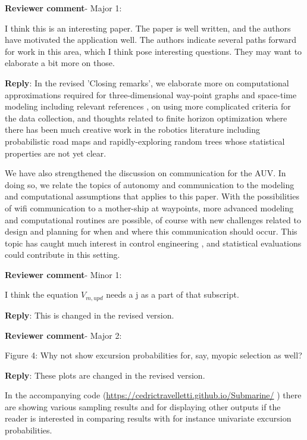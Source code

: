 \documentclass[a4paper]{article}
\def\revcom{\textbf{Reviewer comment}}
\def\reply{\textbf{Reply}}
\begin{document}
\begin{answers}

\item{\revcom - Major 1:}\label{r3c1}

I think this is an interesting paper. The paper is well written, 
and the authors have motivated the application well. 
The authors indicate several paths forward for work in this area, which I think pose interesting questions. They may want to elaborate a bit more on those.

\reply: In the revised 'Closing remarks', we elaborate more on computational approximations required for three-dimensional way-point graphs and space-time modeling including relevant references \citep{sigrist2015stochastic,richardson2017sparsity}, on using more complicated criteria for the data collection, and thoughts related to finite horizon optimization where there has been much creative work in the robotics literature including probabilistic road maps and rapidly-exploring random trees \citep{karaman2011sampling} whose statistical properties are not yet clear.

We have also strengthened the discussion on communication for the AUV. In doing so, we relate the topics of autonomy and communication to the modeling and computational assumptions that applies to this paper. With the possibilities of wifi communication to a mother-ship at waypoints, more advanced modeling and computational routines are possible, of course with new challenges related to design and planning for when and where this communication should occur. This topic has caught much interest in control engineering \citep{zolich2019survey}, and statistical evaluations could contribute in this setting.

\item{\revcom - Minor 1:}\label{r3c2}

I think the equation $V_{m,upd}$ needs a j as a part of that subscript.

\reply: This is changed in the revised version.

\item{\revcom - Major 2:}\label{r3c3}

Figure 4: Why not show excursion probabilities for, say, myopic selection as well?

\reply: These plots are changed in the revised version. 

In the accompanying code (\url{https://cedrictravelletti.github.io/Submarine/} )
there are showing various sampling results and for displaying other outputs if the reader is interested in comparing results with for instance univariate excursion probabilities.

\end{answers}


\footnotesize



\end{document}

